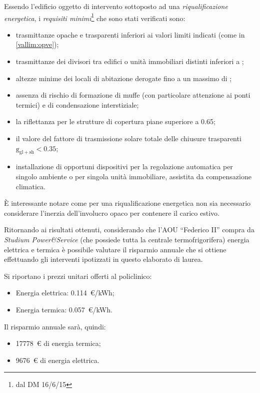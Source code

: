 Essendo l'edificio oggetto di intervento sottoposto ad una \emph{riqualificazione energetica}, i \emph{requisiti minimi}\footnote{dal DM 16/6/15} che sono stati verificati sono:
\begin{itemize}
	\item trasmittanze opache e trasparenti inferiori ai valori limiti indicati (come in \vref{vallim:opve});
	\item trasmittanze dei divisori tra edifici o unità immobiliari distinti inferiori a ;
	\item altezze minime dei locali di abitazione derogate fino a un massimo di ;
	\item assenza di rischio di formazione di muffe (con particolare attenzione ai ponti termici) e di condensazione interstiziale;
	\item la riflettanza per le strutture di copertura piane superiore a \num{0.65};
	\item il valore del fattore di trasmissione solare totale delle chiusure trasparenti $\mathrm{g_{gl+sh}<0.35}$;
	\item installazione di opportuni dispositivi per la regolazione automatica per singolo ambiente o per singola unità immobiliare, assistita da compensazione climatica.
\end{itemize}
È interessante notare come per una riqualificazione energetica non sia necessario considerare l'inerzia dell'involucro opaco per contenere il carico estivo.

Ritornando ai risultati ottenuti, considerando che l'AOU ``Federico II'' compra da \emph{Studium Power\&Service} (che possiede tutta la centrale termofrigorifera) energia elettrica e termica è possibile valutare il risparmio annuale che si ottiene effettuando gli interventi ipotizzati in questo elaborato di laurea.

Si riportano i prezzi unitari offerti al policlinico: 
\begin{itemize}
	\item Energia elettrica: \num{0.114}\ \euro/kWh;
	\item Energia termica: \num{0.057}\ \euro/kWh.
\end{itemize}
Il risparmio annuale sarà, quindi:
\begin{itemize}
	\item \num{17778}\ \euro\- di energia termica; %
	\item \num{9676}\ \euro\- di energia elettrica.
\end{itemize}

